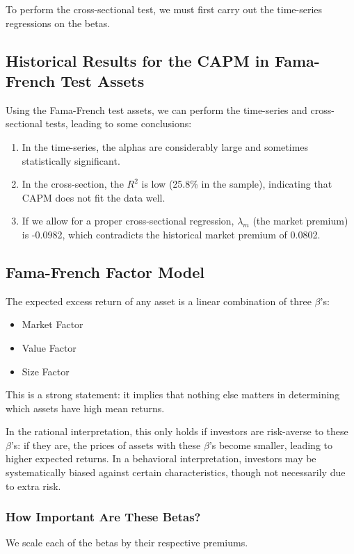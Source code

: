 \documentclass{article}
\begin{document}
To perform the cross-sectional test, we must first carry out the time-series regressions on the betas.

\subsection{Historical Results for the CAPM in Fama-French Test Assets}
Using the Fama-French test assets, we can perform the time-series and cross-sectional tests, leading to some conclusions:
\begin{enumerate}
    \item In the time-series, the alphas are considerably large and sometimes statistically significant.
    \item In the cross-section, the $R^2$ is low (25.8\% in the sample), indicating that CAPM does not fit the data well.
    \item If we allow for a proper cross-sectional regression, $\lambda_{m}$ (the market premium) is -0.0982, which contradicts the historical market premium of 0.0802.
\end{enumerate}

\subsection{Fama-French Factor Model}
The expected excess return of any asset is a linear combination of three $\beta$'s:
\begin{itemize}
    \item Market Factor
    \item Value Factor
    \item Size Factor
\end{itemize}

This is a strong statement: it implies that nothing else matters in determining which assets have high mean returns.

In the rational interpretation, this only holds if investors are risk-averse to these $\beta$'s: if they are, the prices of assets with these $\beta$'s become smaller, leading to higher expected returns. In a behavioral interpretation, investors may be systematically biased against certain characteristics, though not necessarily due to extra risk.

\subsubsection{How Important Are These Betas?}
We scale each of the betas by their respective premiums.
\end{document}
